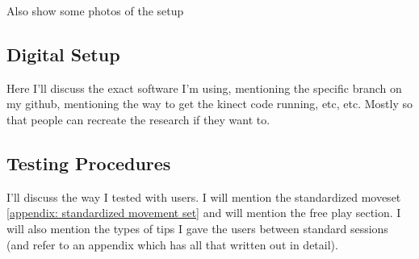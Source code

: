 Also show some photos of the setup


\subsection{Digital Setup}
\label{sub-section: experiments - test setup - digital space}
Here I'll discuss the exact software I'm using, mentioning the specific branch on my github, mentioning the way to get the kinect code running, etc, etc.
Mostly so that people can recreate the research if they want to.

\subsection{Testing Procedures}
\label{sub-section: experiments - test setup - testing procedures} 
I'll discuss the way I tested with users. 
I will mention the standardized moveset \ref{appendix: standardized movement set} and will mention the free play section.
I will also mention the types of tips I gave the users between standard sessions (and refer to an appendix which has all that written out in detail).


